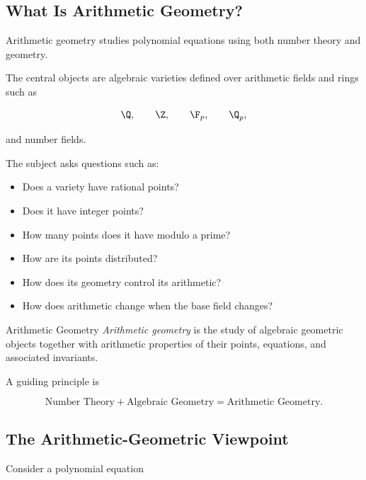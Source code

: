 \subsection{What Is Arithmetic Geometry?}
\label{subsec:what-is-arithmetic-geometry}

Arithmetic geometry studies polynomial equations using both number theory
and geometry.

The central objects are algebraic varieties defined over arithmetic fields
and rings such as

\[ \Q,\qquad \Z,\qquad \F_p,\qquad \Q_p, \]

and number fields.

The subject asks questions such as:

\begin{itemize}
    \item Does a variety have rational points?
    \item Does it have integer points?
    \item How many points does it have modulo a prime?
    \item How are its points distributed?
    \item How does its geometry control its arithmetic?
    \item How does arithmetic change when the base field changes?
\end{itemize}

\begin{definitionbox}{Arithmetic Geometry}
\emph{Arithmetic geometry} is the study of algebraic geometric objects
together with arithmetic properties of their points, equations, and
associated invariants.
\end{definitionbox}

A guiding principle is

\[
\boxed{
\text{Number Theory}
+
\text{Algebraic Geometry}
=
\text{Arithmetic Geometry}.
}
\]

\subsection{The Arithmetic-Geometric Viewpoint}
\label{subsec:arithmetic-geometric-viewpoint}

Consider a polynomial equation

